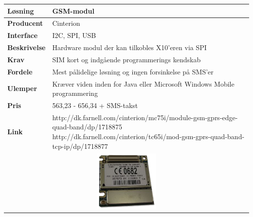 \begin{table}[H] \centering
	\label{tab:GSM1}
\begin{tabular}{|p{6cm}|p{8cm}|}
	\hline
		\textbf{Løsning}				&GSM-modul \\ \hline
		\textbf{Producent} 			&Cinterion \\ \hline
		\textbf{Interface} 			&I2C, SPI, USB \\ \hline
		\textbf{Beskrivelse} 		&Hardware modul der kan tilkobles X10'eren via SPI \\ \hline
		\textbf{Krav} 				&SIM kort og indgående programmerings kendskab \\ \hline
		\textbf{Fordele}				&Mest pålidelige løsning og ingen forsinkelse på SMS'er \\ \hline
		\textbf{Ulemper} 			&Kræver viden inden for Java eller Microsoft Windows Mobile programmering \\ \hline
		\textbf{Pris} 				&563,23 - 656,34 + SMS-takst \\ \hline
		\textbf{Link} 				&http://dk.farnell.com/cinterion/mc75i/module-gsm-gprs-edge-quad-band/dp/1718875 \newline
									 http://dk.farnell.com/cinterion/tc65i/mod-gsm-gprs-quad-band-tcp-ip/dp/1718877 \\ \hline
		\multicolumn{2}{|c|}{\includegraphics[height=3cm]{billeder/GSM_TC65I}} 	
\\ \hline

\end{tabular}
\end{table}

